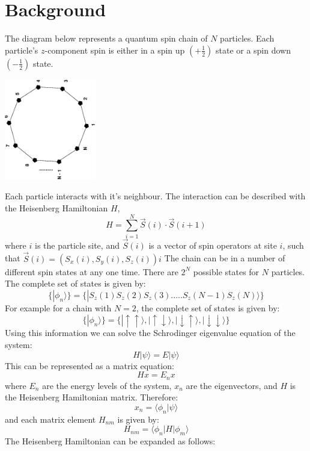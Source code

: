 \documentclass[a4paper]{IEEEtran}
\begin{document}
\section{Background}
    The diagram below represents a quantum spin chain of $N$ particles.
    Each particle's $z$-component spin is either in a 
    spin up $\left(+\frac{1}{2}\right)$ state or
    a spin down $\left(-\frac{1}{2}\right)$ state.
    \begin{center}
        \includegraphics[angle=-90, width=4cm]{chain.eps}
    \end{center}
    Each particle interacts with it's neighbour. The interaction can be described
    with the Heisenberg Hamiltonian $H$,
        \[ H = \sum_{i = 1}^{N} \vec{S}(i) \cdot \vec{S}(i+1) \]
    where $i$ is the particle site, and $\vec{S}(i)$ is a vector of spin
    operators at site $i$, such that
        $\vec{S}(i) = (S_x(i), S_y(i), S_z(i) ) i$
    The chain can be in a number of different spin states at any one time. There
    are $2^N$ possible states for $N$ particles. The complete set of states 
    is given by:
        \[ \{| \phi_n \rangle \} = \{ | S_z(1)S_z(2)S_z(3).....S_z(N-1)S_z(N) \rangle \} \]
    For example for a chain with $N=2$, the complete set of states is given by:
        \[ \{|\phi_n\rangle\} = \{ |\uparrow \uparrow \rangle,
                                   |\uparrow \downarrow \rangle,
                                   |\downarrow \uparrow \rangle,
                                   |\downarrow \downarrow \rangle\}\]
    Using this information we can solve the Schrodinger eigenvalue equation of the
    system:
        \[ H|\psi\rangle = E|\psi\rangle\]
    This can be represented as a matrix equation:
        \[ Hx = E_n x\]
    where $E_n$ are the energy levels of the system, $x_n$ are the eigenvectors,
    and $H$ is the Heisenberg Hamiltonian matrix. Therefore:
        \[ x_n = \langle \phi_n | \psi \rangle \]
    and each matrix element $H_{nm}$ is given by:
        \[ H_{nm} = \langle \phi_n | H | \phi_m \rangle \]
    The Heisenberg Hamiltonian can be expanded as follows:
\end{document}
